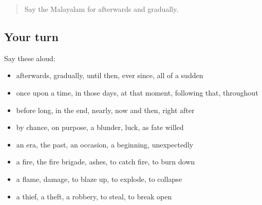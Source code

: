 \begin{quote}
Say the Malayalam for afterwards and gradually.
\end{quote}

\subsection*{Your turn}
Say these aloud:

\begin{itemize}
\raggedright
  \item afterwards, gradually, until then, ever since, all of a sudden
  \item once upon a time, in those days, at that moment, following that, throughout
  \item before long, in the end, nearly, now and then, right after
  \item by chance, on purpose, a blunder, luck, as fate willed
  \item an era, the past, an occasion, a beginning, unexpectedly
  \item a fire, the fire brigade, ashes, to catch fire, to burn down
  \item a flame, damage, to blaze up, to explode, to collapse
  \item a thief, a theft, a robbery, to steal, to break open
\end{itemize}

